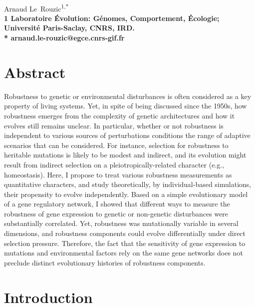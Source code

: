 \documentclass[10pt,a4paper]{article}
\title{}
\date{}
\begin{document}
\vspace*{0.35in}

\begin{flushleft}
{\Large
\textbf{}
}
\newline
\\
Arnaud Le~Rouzic\textsuperscript{1,*}
\\
\bigskip
\bf{1} Laboratoire Évolution: Génomes, Comportement, Écologie; Université Paris-Saclay, CNRS, IRD.
\\
\bigskip
* arnaud.le-rouzic@egce.cnrs-gif.fr

\end{flushleft}

\section*{Abstract}

Robustness to genetic or environmental disturbances is often considered as a key property of living systems. Yet, in spite of being discussed since the 1950s, how robustness emerges from the complexity of genetic architectures and how it evolves still remains unclear. In particular, whether or not robustness is independent to various sources of perturbations conditions the range of adaptive scenarios that can be considered. For instance, selection for robustness to heritable mutations is likely to be modest and indirect, and its evolution might result from indirect selection on a pleiotropically-related character (e.g., homeostasis). Here, I propose to treat various robustness measurements as quantitative characters, and study theoretically, by individual-based simulations, their propensity to evolve independently. Based on a simple evolutionary model of a gene regulatory network, I showed that different ways to measure the robustness of gene expression to genetic or non-genetic disturbances were substantially correlated. Yet, robustness was mutationally variable in several dimensions, and robustness components could evolve differentially under direct selection pressure. Therefore, the fact that the sensitivity of gene expression to mutations and environmental factors rely on the same gene networks does not preclude distinct evolutionary histories of robustness components.


\section{Introduction}
\end{document}
